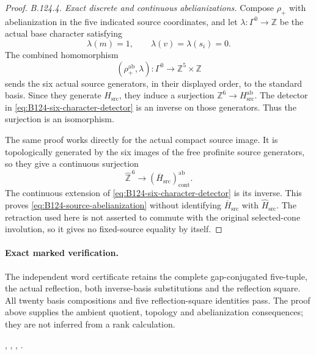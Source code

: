 \begin{proof}
\emph{B.124.4. Exact discrete and continuous abelianizations.}
Compose $\rho_+$ with abelianization in the five indicated source
coordinates, and let $\lambda:\Gamma^0\to\mathbb Z$ be the actual
base character satisfying
\[
 \lambda(m)=1,\qquad \lambda(v)=\lambda(s_i)=0.
\]
The combined homomorphism
\begin{equation}\label{eq:B124-six-character-detector}
 (\rho_+^{\mathrm{ab}},\lambda):\Gamma^0
       \longrightarrow\mathbb Z^5\times\mathbb Z
\end{equation}
sends the six actual source generators, in their displayed order,
to the standard basis. Since they generate $H_{\mathrm{src}}$,
they induce a surjection $\mathbb Z^6\to H_{\mathrm{src}}^{\mathrm{ab}}$.
The detector in \eqref{eq:B124-six-character-detector} is an inverse
on those generators. Thus the surjection is an isomorphism.

The same proof works directly for the actual compact source image.
It is topologically generated by the six images of the free
profinite source generators, so they give a continuous surjection
\[
 \widehat{\mathbb Z}^{\,6}\longrightarrow
       (\overline H_{\mathrm{src}})^{\mathrm{ab}}_{\mathrm{cont}}.
\]
The continuous extension of
\eqref{eq:B124-six-character-detector} is its inverse. This proves
\eqref{eq:B124-source-abelianization} without identifying
$\overline H_{\mathrm{src}}$ with $\widehat H_{\mathrm{src}}$.
The retraction used here is not asserted to commute with the
original selected-cone involution, so it gives no fixed-source
equality by itself.
\end{proof}

\paragraph{Exact marked verification.}
The independent word certificate retains the complete gap-conjugated
five-tuple, the actual reflection, both inverse-basis substitutions
and the reflection square. All twenty basis compositions and five
reflection-square identities pass. The proof above supplies the
ambient quotient, topology and abelianization consequences; they
are not inferred from a rank calculation.
\begingroup\raggedright
{},
,
,
.
\par\endgroup
